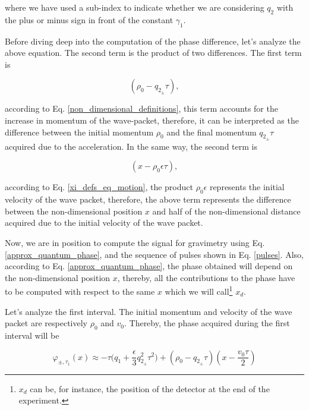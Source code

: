 \documentclass{article}
\begin{document}
where we have used a sub-index to indicate whether we are considering $q_{2}$ with the plus or minus sign in front of the constant $\gamma_{1}$. 

Before diving deep into the computation of the phase difference, let's analyze the above equation. The second term is the product of two differences. The first term is 

\begin{equation}\label{momentum_change}
(\rho_{0} - q_{2_{\pm}} \tau),
\end{equation}

according to Eq. \ref{non_dimensional_definitions}, this term accounts for the increase in momentum of the wave-packet, therefore, it can be interpreted as the difference between the initial momentum $\rho_{0}$ and the final momentum $q_{2_{\pm}} \tau$ acquired due to the acceleration. In the same way, the second term is

\begin{equation}\label{position_change}
(x-\rho_{0} \epsilon \tau),
\end{equation}

according to Eq. \ref{xi_defs_eq_motion}, the product $\rho_{0} \epsilon$ represents the initial velocity of the wave packet, therefore, the above term represents the difference between the non-dimensional position $x$ and half of the non-dimensional distance acquired due to the initial velocity of the wave packet.

Now, we are in position to compute the signal for gravimetry using Eq. \ref{approx_quantum_phase}, and the sequence of pulses shown in Eq. \ref{pulses}. Also, according to Eq. \ref{approx_quantum_phase}, the phase obtained will depend on the non-dimensional position $x$, thereby, all the contributions to the phase have to be computed with respect to the same $x$ which we will call\footnote{$x_{d}$ can be, for instance, the position of the detector at the end of the experiment.} $x_{d}$.

Let's analyze the first interval. The initial momentum and velocity of the wave packet are respectively $\rho_{0}$ and $v_{0}$. Thereby, the phase acquired during the first interval will be

\begin{equation}\label{approx_quantum_phase_1}
\varphi_{\pm, \tau_{1}}(x) \approx -\tau \bigg(q_{1} + \frac{\epsilon}{3} q_{2_{\pm}}^{2} \tau^{2}\bigg) + (\rho_{0} - q_{2_{\pm}} \tau)(x-\frac{v_{0} \tau}{2})
\end{equation}
\end{document}
